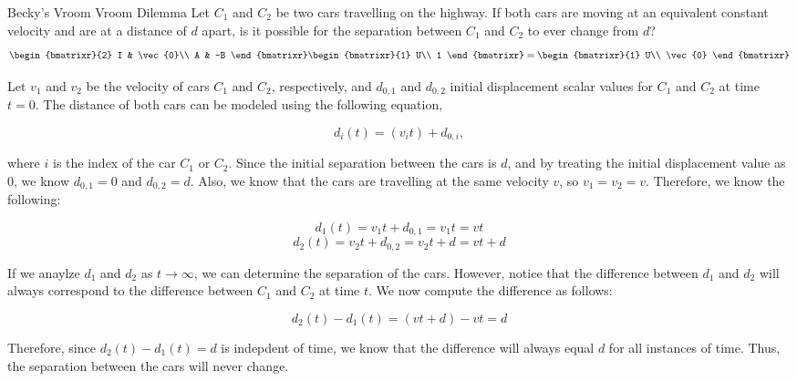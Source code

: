 \documentclass[11pt]{article}
\newcommand{\basiseq}{
\begin{bmatrixr}{2}
    I & \vec{0}\\
    A & -B
  \end{bmatrixr}
  \begin{bmatrixr}{1}
    U\\ 1
  \end{bmatrixr}
  =
  \begin{bmatrixr}{1}
    U\\ \vec{0}
  \end{bmatrixr}
}
\begin{document}
\arltitle{}{}
\begin{prob}{Becky's Vroom Vroom Dilemma} Let $C_{1}$ and $C_{2}$ be two cars travelling on the highway. If both cars are moving at an equivalent constant velocity and are at a distance of $d$ apart, is it possible for the separation between $C_{1}$ and $C_{2}$ to ever change from $d$?
\begin{equation*}\basiseq\end{equation*}
\end{prob}
\begin{sol} 

Let $v_{1}$ and $v_{2}$ be the velocity of cars $C_{1}$ and $C_{2}$, respectively, and $d_{0,1}$ and $d_{0,2}$ initial displacement scalar values for $C_{1}$ and $C_{2}$ at time $t = 0$. The distance of both cars can be modeled using the following equation,

\begin{equation*}
d_{i}(t) = (v_{i}t) + d_{0,i},
\end{equation*}

where $i$ is the index of the car $C_{1}$ or $C_{2}$. Since the initial separation between the cars is $d$, and by treating the initial displacement value as $0$, we know $d_{0,1} = 0$ and $d_{0,2} = d$. Also, we know that the cars are travelling at the same velocity $v$, so $v_{1} = v_{2} = v$. Therefore, we know the following:

\begin{equation*}
d_{1}(t) = v_{1}t + d_{0,1} = v_{1}t = vt
\end{equation*}
\begin{equation*}
d_{2}(t) = v_{2}t + d_{0,2} = v_{2}t + d = vt + d
\end{equation*}

If we anaylze $d_{1}$ and $d_{2}$ as $t \to \infty$, we can determine the separation of the cars. However, notice that the difference between $d_{1}$ and $d_{2}$ will always correspond to the difference between $C_{1}$ and $C_{2}$ at time $t$. We now compute the difference as follows:

\begin{equation*}
d_{2}(t) - d_{1}(t) = (vt + d) - vt = d
\end{equation*}

Therefore, since $d_{2}(t) - d_{1}(t) = d$ is indepdent of time, we know that the difference will always equal $d$ for all instances of time. Thus, the separation between the cars will never change.

\end{sol}
\end{document}
